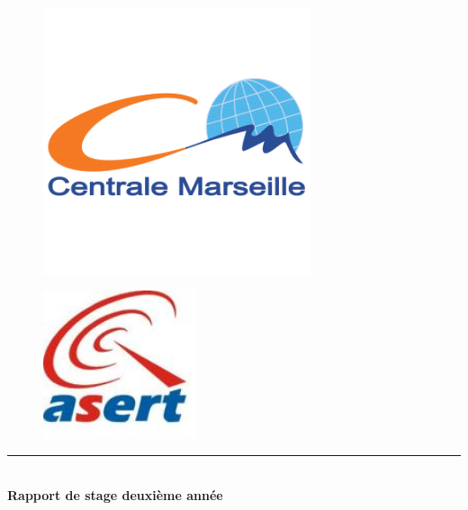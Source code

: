 \begin{titlepage}
\begin{center}

\begin{figure}[ht]
  \begin{minipage}[b]{0.5\linewidth}
    \centering
    \includegraphics[width=0.7\textwidth]{img/logo_ecm}
    \label{logo_ecm}
  \end{minipage}
  \hspace{0.5cm}
  \begin{minipage}[t]{0.5\linewidth}
    \vspace{-4cm}
    \begin{center}
    \includegraphics[width=0.4\textwidth]{img/logo_asert}
    \end{center}
    \label{logo_asert}
  \end{minipage}
\end{figure}



\vspace{2cm}
\hrule  ~\\[0.4cm]
{ \huge \bfseries Rapport de stage deuxième année}\\[0.4cm]


\end{center}
\end{titlepage}
